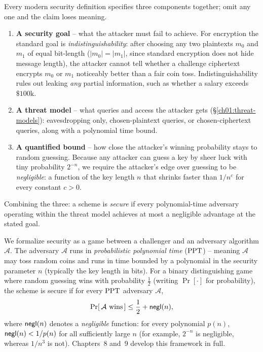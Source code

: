 Every modern security definition specifies three components together; omit any one and the claim loses meaning.

\begin{enumerate}
  \item \textbf{A security goal} -- what the attacker must fail to achieve. For encryption the standard goal is \emph{indistinguishability}: after choosing any two plaintexts $m_0$ and $m_1$ of equal bit-length ($|m_0| = |m_1|$, since standard encryption does not hide message length), the attacker cannot tell whether a challenge ciphertext encrypts $m_0$ or $m_1$ noticeably better than a fair coin toss. Indistinguishability rules out leaking \emph{any} partial information, such as whether a salary exceeds $\$100\text{k}$.
  \item \textbf{A threat model} -- what queries and access the attacker gets (\S\ref{ch01:threat-models}): eavesdropping only, chosen-plaintext queries, or chosen-ciphertext queries, along with a polynomial time bound.
  \item \textbf{A quantified bound} -- how close the attacker's winning probability stays to random guessing. Because any attacker can guess a key by sheer luck with tiny probability $2^{-n}$, we require the attacker's edge over guessing to be \emph{negligible}: a function of the key length $n$ that shrinks faster than $1/n^c$ for every constant $c > 0$.
\end{enumerate}

Combining the three: a scheme is \emph{secure} if every polynomial-time adversary operating within the threat model achieves at most a negligible advantage at the stated goal.

\begin{formalbox}
We formalize security as a game between a challenger and an adversary algorithm $\mathcal{A}$. The adversary $\mathcal{A}$ runs in \emph{probabilistic polynomial time} ($\mathrm{PPT}$) -- meaning $\mathcal{A}$ may toss random coins and runs in time bounded by a polynomial in the security parameter $n$ (typically the key length in bits). For a binary distinguishing game where random guessing wins with probability $\frac{1}{2}$ (writing $\Pr[\cdot]$ for probability), the scheme is secure if for every $\mathrm{PPT}$ adversary $\mathcal{A}$,
\[
\Pr[\,\mathcal{A} \text{ wins}\,] \le \frac{1}{2} + \mathsf{negl}(n),
\]
where $\mathsf{negl}(n)$ denotes a \emph{negligible} function: for every polynomial $p(n)$, $\mathsf{negl}(n) < 1/p(n)$ for all sufficiently large $n$ (for example, $2^{-n}$ is negligible, whereas $1/n^3$ is not). Chapters~8 and~9 develop this framework in full.
\end{formalbox}

